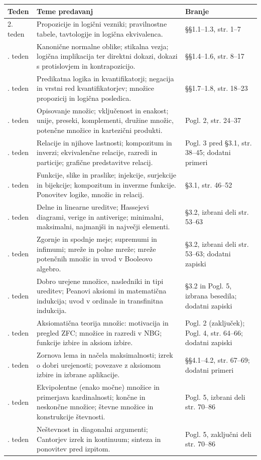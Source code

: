 \documentclass[11pt, a4paper]{article}
\begin{document}
\begin{tabularx}{\textwidth}{@{} l X p{3.5cm} @{}}
\toprule
\textbf{Teden} & \textbf{Teme predavanj} & \textbf{Branje} \\ 
\midrule
2. teden & Propozicije in logični vezniki; pravilnostne tabele, tavtologije in logična ekvivalenca. & §§1.1–1.3, str. 1–7 \\ \addlinespace
3. teden & Kanonične normalne oblike; stikalna vezja; logična implikacija ter direktni dokazi, dokazi s protislovjem in kontrapozicijo. & §§1.4–1.6, str. 8–17 \\ \addlinespace
4. teden & Predikatna logika in kvantifikatorji; negacija in vrstni red kvantifikatorjev; množice propozicij in logična posledica. & §§1.7–1.8, str. 18–23 \\ \addlinespace
5. teden & Opisovanje množic; vključenost in enakost; unije, preseki, komplementi, družine množic, potenčne množice in kartezični produkti. & Pogl. 2, str. 24–37 \\ \addlinespace
6. teden & Relacije in njihove lastnosti; kompozitum in inverzi; ekvivalenčne relacije, razredi in particije; grafične predstavitve relacij. & Pogl. 3 pred §3.1, str. 38–45; dodatni primeri \\ \addlinespace
7. teden & Funkcije, slike in praslike; injekcije, surjekcije in bijekcije; kompozitum in inverzne funkcije. Ponovitev logike, množic in relacij. & §3.1, str. 46–52 \\ \addlinespace
9. teden & Delne in linearne ureditve; Hassejevi diagrami, verige in antiverige; minimalni, maksimalni, najmanjši in največji elementi. & §3.2, izbrani deli str. 53–63 \\ \addlinespace
10. teden & Zgornje in spodnje meje; supremumi in infimumi; mreže in polne mreže; mreže potenčnih množic in uvod v Booleovo algebro. & §3.2, izbrani deli str. 53–63; dodatni zapiski \\ \addlinespace
11. teden & Dobro urejene množice, nasledniki in tipi ureditev; Peanovi aksiomi in matematična indukcija; uvod v ordinale in transfinitna indukcija. & §3.2 in Pogl. 5, izbrana besedila; dodatni zapiski \\ \addlinespace
12. teden & Aksiomatična teorija množic: motivacija in pregled ZFC; množice in razredi v NBG; funkcije izbire in aksiom izbire. & Pogl. 2 (zaključek); Pogl. 4, str. 64–66; dodatni zapiski \\ \addlinespace
13. teden & Zornova lema in načela maksimalnosti; izrek o dobri urejenosti; povezave z aksiomom izbire in izbrane aplikacije. & §§4.1–4.2, str. 67–69; dodatni primeri \\ \addlinespace
15. teden & Ekvipolentne (enako močne) množice in primerjava kardinalnosti; končne in neskončne množice; števne množice in konstrukcije števnosti. & Pogl. 5, izbrani deli str. 70–86 \\ \addlinespace
16. teden & Neštevnost in diagonalni argumenti; Cantorjev izrek in kontinuum; sinteza in ponovitev pred izpitom. & Pogl. 5, zaključni deli str. 70–86 \\
\bottomrule
\end{tabularx}
\end{document}
